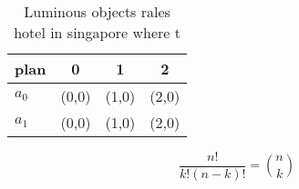 \documentclass[a4paper]{article}
\begin{document}
\begin{table}
\begin{adjustbox}{width=0.6\columnwidth}
\begin{tabular}{|l|l|l|l|}
\hline
\textbf{plan} & \multicolumn{1}{c|}{\textbf{0}} & \multicolumn{1}{c|}{\textbf{1}} & \multicolumn{1}{c|}{\textbf{2}} \\ \hline
\textbf{$a_0$}  & (0,0) & (1,0) & (2,0) \\ \hline
\textbf{$a_1$}  & (0,0) & (1,0) & (2,0) \\ \hline
\end{tabular}
\end{adjustbox}
\caption{Luminous objects rales hotel in singapore where t
}
\end{table}

\[ \frac{n!}{k!(n-k)!} = \binom{n}{k} \]
\end{document}
